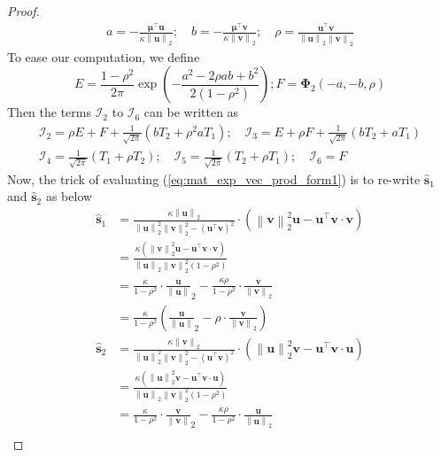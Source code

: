 \documentclass[10pt,a4paper]{amsart}
\def\bfs{{\mathbf{s}}}\def\bft{{\mathbf{t}}}
\def\bfu{{\mathbf{u}}}\def\bfv{{\mathbf{v}}}\def\bfw{{\mathbf{w}}}\def\bfx{{\mathbf{x}}}
\def\bfv{{\mathbf{v}}}\def\bfw{{\mathbf{w}}}\def\bfx{{\mathbf{x}}}
\newcommand{\norm}[1]{\left\|#1\right\|}
\newcommand{\paren}[1]{\left(#1\right)}
\begin{document}
\begin{proof}
\begin{gather*}
        a = -\frac{\bm{\mu}^\top\bfu}{\kappa\norm{\bfu}_2};\quad b = -\frac{\bm{\mu}^\top\bfv}{\kappa\norm{\bfv}_2};\quad \rho = \frac{\bfu^\top\bfv}{\norm{\bfu}_2\norm{\bfv}_2}
    \end{gather*}
    To ease our computation, we define 
    \[
        E = \frac{1-\rho^2}{2\pi}\exp\paren{-\frac{a^2 - 2\rho ab + b^2}{2\paren{1-\rho^2}}}; F = \bm{\Phi}_2\paren{-a,-b,\rho}
    \]
    Then the terms $\mathcal{I}_2$ to $\mathcal{I}_6$ can be written as
    \begin{equation}
        \label{eq:I_terms_simp}
        \begin{gathered}
            \mathcal{I}_2 = \rho E + F + \frac{1}{\sqrt{2\pi}}\paren{ b T_2 + \rho^2a T_1};\quad \mathcal{I}_3 = E + \rho F + \frac{1}{\sqrt{2\pi}}\paren{ b T_2 + a T_1}\\
            \mathcal{I}_4 =\frac{1}{\sqrt{2\pi}}\paren{T_1 + \rho T_2};\quad \mathcal{I}_5 = \frac{1}{\sqrt{2\pi}}\paren{T_2 + \rho T_1};\quad\mathcal{I}_6 = F
            \end{gathered}
    \end{equation}
    Now, the trick of evaluating (\ref{eq:mat_exp_vec_prod_form1}) is to re-write $\hat{\bfs}_1$ and $\hat{\bfs}_2$ as below
    \begin{equation}
        \label{eq:s1_s2_simp}
        \begin{aligned}
            \hat{\bfs}_1 & = \frac{\kappa\norm{\bfu}_2}{ \norm{\bfu}_2^2\norm{\bfv}_2^2 - \paren{\bfu^\top\bfv}^2}\cdot\paren{\norm{\bfv}_2^2\bfu - \bfu^\top\bfv\cdot\bfv}\\
            & = \frac{\kappa\paren{\norm{\bfv}_2^2\bfu - \bfu^\top\bfv\cdot\bfv}}{\norm{\bfu}_2\norm{\bfv}_2^2\paren{1 - \rho^2}}\\
            & = \frac{\kappa}{1-\rho^2}\cdot\frac{\bfu}{\norm{\bfu}}_2 - \frac{\kappa\rho}{1 - \rho^2}\cdot\frac{\bfv}{\norm{\bfv}_2}\\
            & = \frac{\kappa}{1-\rho^2}\paren{\frac{\bfu}{\norm{\bfu}}_2 - \rho\cdot \frac{\bfv}{\norm{\bfv}_2}}\\
            \hat{\bfs}_2 & = \frac{\kappa\norm{\bfv}_2}{ \norm{\bfu}_2^2\norm{\bfv}_2^2 - \paren{\bfu^\top\bfv}^2}\cdot\paren{\norm{\bfu}_2^2\bfv - \bfu^\top\bfv\cdot\bfu}\\
            & = \frac{\kappa\paren{\norm{\bfu}_2^2\bfv - \bfu^\top\bfv\cdot\bfu}}{\norm{\bfu}_2\norm{\bfv}_2^2\paren{1 - \rho^2}}\\
            & = \frac{\kappa}{1-\rho^2}\cdot\frac{\bfv}{\norm{\bfv}}_2 - \frac{\kappa\rho}{1 - \rho^2}\cdot\frac{\bfu}{\norm{\bfu}_2}\\

\end{aligned}
\end{equation}
\end{proof}
\end{document}
